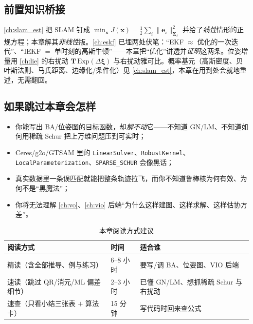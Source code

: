 \subsection*{前置知识桥接}
\cref{ch:slam_est} 把 SLAM 钉成 $\min_{\mathbf{x}}J(\mathbf{x})=\tfrac12\sum_i\|\mathbf{e}_i\|_{\boldsymbol{\Sigma}_i}^2$ 并给了\emph{线性}情形的正规方程；本章解其\emph{非线性}版。\cref{ch:eskf} 已埋两处伏笔：“EKF $\approx$ 优化的一次迭代”、“IEKF $=$ 单时刻的高斯牛顿”——本章把“优化”讲透并\emph{证明}这两条。位姿增量用 \cref{ch:lie} 的右扰动 $\mathbf{T}\,\mathrm{Exp}(\Delta\boldsymbol{\xi})$ 与右扰动雅可比。概率基元（高斯密度、贝叶斯法则、马氏距离、边缘化/条件化）见 \cref{ch:slam_est}，本章在用到处会就地重述，无需翻回。

\subsection*{如果跳过本章会怎样}
\begin{itemize}
  \item 你能写出 BA/位姿图的目标函数，却\emph{解不动}它——不知道 GN/LM、不知道如何用稀疏 Schur 把上万维问题压到可实时；
  \item Ceres/g2o/GTSAM 里的 \texttt{LinearSolver}、\texttt{RobustKernel}、\texttt{LocalParameterization}、\texttt{SPARSE\_SCHUR} 会像黑话；
  \item 真实数据里一条误匹配就能把整条轨迹拉飞，而你不知道鲁棒核为何有效、为何不是“黑魔法”；
  \item 你将无法理解 \cref{ch:vo}、\cref{ch:vio} 后端“为什么这样建图、这样求解、这样估协方差”。
\end{itemize}

\begin{table}[H]\centering\small
\caption{本章阅读方式建议}
\begin{tabular}{lll}
\toprule
阅读方式 & 时间 & 适合谁 \\
\midrule
精读（含全部推导、例与练习） & 6--8 小时 & 要写/调 BA、位姿图、VIO 后端 \\
速读（跳过 QR/消元/ML 偏差细节） & 2--3 小时 & 已懂 GN/LM、想抓稀疏 Schur 与右扰动 \\
速查（只看小结三张表 $+$ 算法卡） & 15 分钟 & 写代码时回来查公式 \\
\bottomrule
\end{tabular}
\end{table}

